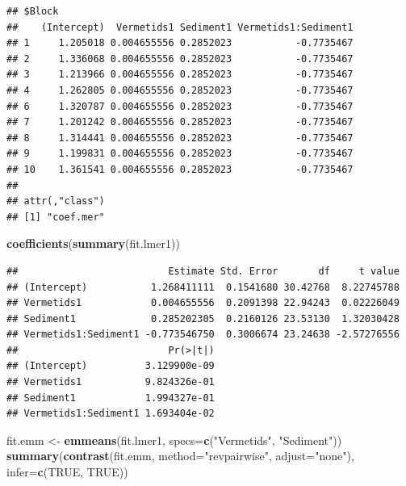 \documentclass[]{book}
\newenvironment{Shaded}{\begin{snugshade}}{\end{snugshade}}
\newcommand{\KeywordTok}[1]{\textcolor[rgb]{0.13,0.29,0.53}{\textbf{#1}}}
\newcommand{\DataTypeTok}[1]{\textcolor[rgb]{0.13,0.29,0.53}{#1}}
\newcommand{\StringTok}[1]{\textcolor[rgb]{0.31,0.60,0.02}{#1}}
\newcommand{\OtherTok}[1]{\textcolor[rgb]{0.56,0.35,0.01}{#1}}
\newcommand{\NormalTok}[1]{#1}
\begin{document}
\begin{verbatim}
## $Block
##    (Intercept)  Vermetids1 Sediment1 Vermetids1:Sediment1
## 1     1.205018 0.004655556 0.2852023           -0.7735467
## 2     1.336068 0.004655556 0.2852023           -0.7735467
## 3     1.213966 0.004655556 0.2852023           -0.7735467
## 4     1.262805 0.004655556 0.2852023           -0.7735467
## 6     1.320787 0.004655556 0.2852023           -0.7735467
## 7     1.201242 0.004655556 0.2852023           -0.7735467
## 8     1.314441 0.004655556 0.2852023           -0.7735467
## 9     1.199831 0.004655556 0.2852023           -0.7735467
## 10    1.361541 0.004655556 0.2852023           -0.7735467
## 
## attr(,"class")
## [1] "coef.mer"
\end{verbatim}

\begin{Shaded}
\begin{Highlighting}[]
\KeywordTok{coefficients}\NormalTok{(}\KeywordTok{summary}\NormalTok{(fit.lmer1))}
\end{Highlighting}
\end{Shaded}

\begin{verbatim}
##                          Estimate Std. Error       df     t value
## (Intercept)           1.268411111  0.1541680 30.42768  8.22745788
## Vermetids1            0.004655556  0.2091398 22.94243  0.02226049
## Sediment1             0.285202305  0.2160126 23.53130  1.32030428
## Vermetids1:Sediment1 -0.773546750  0.3006674 23.24638 -2.57276556
##                          Pr(>|t|)
## (Intercept)          3.129900e-09
## Vermetids1           9.824326e-01
## Sediment1            1.994327e-01
## Vermetids1:Sediment1 1.693404e-02
\end{verbatim}

\begin{Shaded}
\begin{Highlighting}[]
\NormalTok{fit.emm <-}\StringTok{ }\KeywordTok{emmeans}\NormalTok{(fit.lmer1, }\DataTypeTok{specs=}\KeywordTok{c}\NormalTok{(}\StringTok{"Vermetids"}\NormalTok{, }\StringTok{"Sediment"}\NormalTok{))}
\KeywordTok{summary}\NormalTok{(}\KeywordTok{contrast}\NormalTok{(fit.emm, }\DataTypeTok{method=}\StringTok{"revpairwise"}\NormalTok{, }\DataTypeTok{adjust=}\StringTok{"none"}\NormalTok{), }\DataTypeTok{infer=}\KeywordTok{c}\NormalTok{(}\OtherTok{TRUE}\NormalTok{, }\OtherTok{TRUE}\NormalTok{))}
\end{Highlighting}
\end{Shaded}
\end{document}
